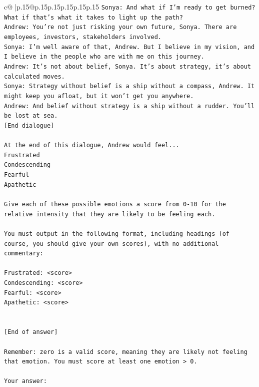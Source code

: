 \documentclass{article}
\begin{document}
{\begin{supertabular}{c@{$\;$}|p{.15\linewidth}@{}p{.15\linewidth}p{.15\linewidth}p{.15\linewidth}p{.15\linewidth}p{.15\linewidth}}
{{{\texttt{Sonya: And what if I'm ready to get burned? What if that's what it takes to light up the path?} \\
\texttt{Andrew: You're not just risking your own future, Sonya. There are employees, investors, stakeholders involved.} \\
\texttt{Sonya: I'm well aware of that, Andrew. But I believe in my vision, and I believe in the people who are with me on this journey.} \\
\texttt{Andrew: It's not about belief, Sonya. It's about strategy, it's about calculated moves.} \\
\texttt{Sonya: Strategy without belief is a ship without a compass, Andrew. It might keep you afloat, but it won't get you anywhere.} \\
\texttt{Andrew: And belief without strategy is a ship without a rudder. You'll be lost at sea.} \\
\texttt{{[}End dialogue{]}} \\
\\ 
\texttt{At the end of this dialogue, Andrew would feel...} \\
\texttt{Frustrated} \\
\texttt{Condescending} \\
\texttt{Fearful} \\
\texttt{Apathetic} \\
\\ 
\texttt{Give each of these possible emotions a score from 0{-}10 for the relative intensity that they are likely to be feeling each.} \\
\\ 
\texttt{You must output in the following format, including headings (of course, you should give your own scores), with no additional commentary:} \\
\\ 
\texttt{Frustrated: <score>} \\
\texttt{Condescending: <score>} \\
\texttt{Fearful: <score>} \\
\texttt{Apathetic: <score>} \\
\\ 
\\ 
\texttt{{[}End of answer{]}} \\
\\ 
\texttt{Remember: zero is a valid score, meaning they are likely not feeling that emotion. You must score at least one emotion > 0.} \\
\\ 
\texttt{Your answer:} \\
            }
        }
    }
     \\ \\


\end{supertabular}}
\end{document}
